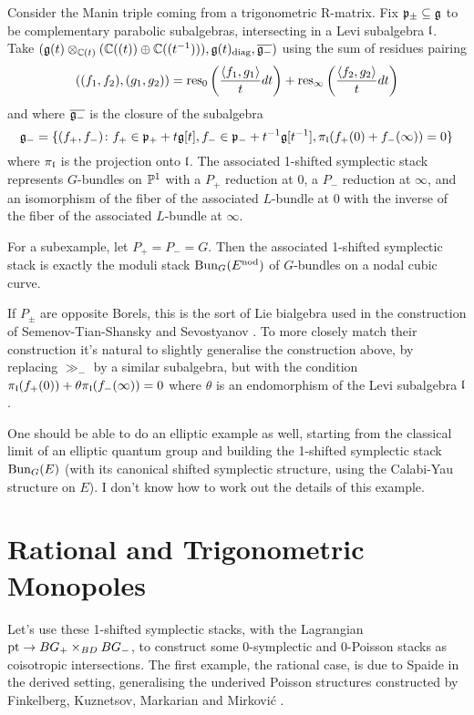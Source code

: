\documentclass[10pt, oneside, a4paper]{article}
\begin{document}
\begin{example}\label{trig_Manin_triple_example}
Consider the Manin triple coming from a trigonometric R-matrix.  Fix $\mathfrak{p}_\pm \subseteq \mathfrak{g}$ to be complementary parabolic subalgebras, intersecting in a Levi subalgebra $\mathfrak{l}$.  Take $(\mathfrak{g}(t) \otimes_{\mathbb{C}(t)} (\mathbb{C}((t)) \oplus \mathbb{C}((t^{-1}))), \mathfrak{g}(t)_{\mathrm{diag}}, \overline{\mathfrak{g}_-})$ using the sum of residues pairing
\[((f_1, f_2), (g_1, g_2)) = \operatorname{res}_0\left( \frac {\langle f_1, g_1\rangle}{t} dt\right) + \operatorname{res}_\infty\left( \frac {\langle f_2, g_2\rangle}{t} dt\right)\]
and where $\overline{\mathfrak{g}_-}$ is the closure of the subalgebra
\[\mathfrak{g}_-= \{(f_+, f_-) \colon f_+ \in \mathfrak{p}_+ + t\mathfrak{g}[t], f_- \in \mathfrak{p}_- + t^{-1}\mathfrak{g}[t^{-1}], \pi_{\mathfrak{l}}(f_+(0) + f_-(\infty)) = 0\}\]
where $\pi_{\mathfrak{l}}$ is the projection onto $\mathfrak{l}$.  The associated 1-shifted symplectic stack represents $G$-bundles on $\mathbb{P}^1$ with a $P_+$ reduction at $0$, a $P_-$ reduction at $\infty$, and an isomorphism of the fiber of the associated $L$-bundle at $0$ with the inverse of the fiber of the associated $L$-bundle at $\infty$.

For a subexample, let $P_+ = P_- = G$.  Then the associated 1-shifted symplectic stack is exactly the moduli stack $\operatorname{Bun}_G(E^{\mathrm{nod}})$ of $G$-bundles on a nodal cubic curve.
\end{example}

\begin{remark}
If $P_\pm$ are opposite Borels, this is the sort of Lie bialgebra used in the construction of Semenov-Tian-Shansky and Sevostyanov \cite{STSS}.  To more closely match their construction it's natural to slightly generalise the construction above, by replacing $\gg_-$ by a similar subalgebra, but with the condition $\pi_{\mathfrak{l}}(f_+(0)) + \theta \pi_{\mathfrak{l}}(f_-(\infty)) = 0$ where $\theta$ is an endomorphism of the Levi subalgebra $\mathfrak{l}$.
\end{remark}

\begin{remark}
One should be able to do an elliptic example as well, starting from the classical limit of an elliptic quantum group and building the 1-shifted symplectic stack $\operatorname{Bun}_G(E)$ (with its canonical shifted symplectic structure, using the Calabi-Yau structure on $E$).  I don't know how to work out the details of this example.
\end{remark}


\section{Rational and Trigonometric Monopoles}
Let's use these 1-shifted symplectic stacks, with the Lagrangian $\operatorname{pt} \to BG_+ \times_{BD} BG_-$, to construct some 0-symplectic and 0-Poisson stacks as coisotropic intersections.  The first example, the rational case, is due to Spaide in the derived setting, generalising the underived Poisson structures constructed by Finkelberg, Kuznetsov, Markarian and Mirkovi\'c \cite{FKMM}.
\end{document}
